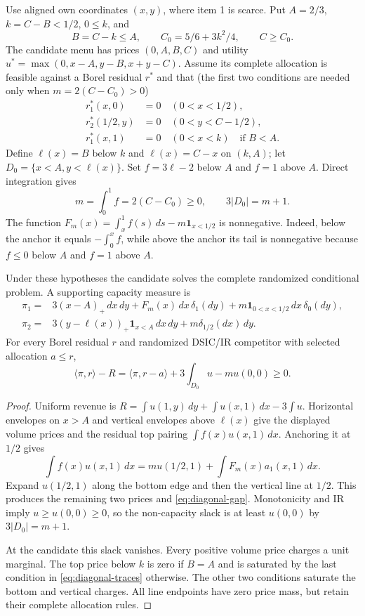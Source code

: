 Use aligned own coordinates $(x,y)$, where item 1 is scarce. Put $A=2/3$,
$k=C-B<1/2$, $0\le k$, and
\[
 B=C-k\le A,\qquad C_0=5/6+3k^2/4,\qquad C\ge C_0.
\]
The candidate menu has prices $(0,A,B,C)$ and utility
$u^*=\max(0,x-A,y-B,x+y-C)$. Assume its complete allocation is feasible
against a Borel residual $r^*$ and that (the first two conditions are
needed only when $m=2(C-C_0)>0$)
\begin{equation}\label{eq:diagonal-traces}
\begin{split}
r^*_1(x,0)&=0\quad(0<x<1/2),\\
r^*_2(1/2,y)&=0\quad(0<y<C-1/2),\\
r^*_1(x,1)&=0\quad(0<x<k)\quad\text{if }B<A.
\end{split}
\end{equation}
Define $\ell(x)=B$ below $k$ and $\ell(x)=C-x$ on $(k,A)$;
let $D_0=\{x<A,y<\ell(x)\}$. Set $f=3\ell-2$ below $A$ and $f=1$
above $A$. Direct integration gives
\[
m=\int_0^1 f=2(C-C_0)\ge0,\qquad 3|D_0|=m+1.
\]
The function $F_m(x)=\int_x^1f(s)\,ds-m\mathbf1_{x<1/2}$ is nonnegative.
Indeed, below the anchor it equals $-\int_0^x f$, while above the anchor
its tail is nonnegative because $f\le0$ below $A$ and $f=1$ above $A$.

\begin{theorem}\label{thm:diagonal}
Under these hypotheses the candidate solves the complete randomized
conditional problem. A supporting capacity measure is
\[
\begin{aligned}
\pi_1={}&3(x-A)_+\,dx\,dy+F_m(x)\,dx\,\delta_1(dy)
                +m\mathbf1_{0<x<1/2}\,dx\,\delta_0(dy),\\
\pi_2={}&3(y-\ell(x))_+\mathbf1_{x<A}\,dx\,dy
                +m\delta_{1/2}(dx)\,dy.
\end{aligned}
\]
For every Borel residual $r$ and randomized DSIC/IR competitor with selected
allocation $a\le r$,
\begin{equation}\label{eq:diagonal-gap}
\langle\pi,r\rangle-R
 =\langle\pi,r-a\rangle+3\int_{D_0}u-mu(0,0)\ge0.
\end{equation}
\end{theorem}
\begin{proof}
Uniform revenue is
$R=\int u(1,y)\,dy+\int u(x,1)\,dx-3\int u$.
Horizontal envelopes on $x>A$ and vertical envelopes above $\ell(x)$
give the displayed volume prices and the residual top pairing
$\int f(x)u(x,1)\,dx$. Anchoring it at $1/2$ gives
\[
\int f(x)u(x,1)\,dx
 =mu(1/2,1)+\int F_m(x)a_1(x,1)\,dx.
\]
Expand $u(1/2,1)$ along the bottom edge and then the vertical line at $1/2$.
This produces the remaining two prices and \eqref{eq:diagonal-gap}.
Monotonicity and IR imply $u\ge u(0,0)\ge0$, so the non-capacity slack is
at least $u(0,0)$ by $3|D_0|=m+1$.

At the candidate this slack vanishes. Every positive volume price charges a
unit marginal. The top price below $k$ is zero if $B=A$ and is saturated by
the last condition in \eqref{eq:diagonal-traces} otherwise. The other two
conditions saturate the bottom and vertical charges. All line endpoints
have zero price mass, but retain their complete allocation rules.
\end{proof}

